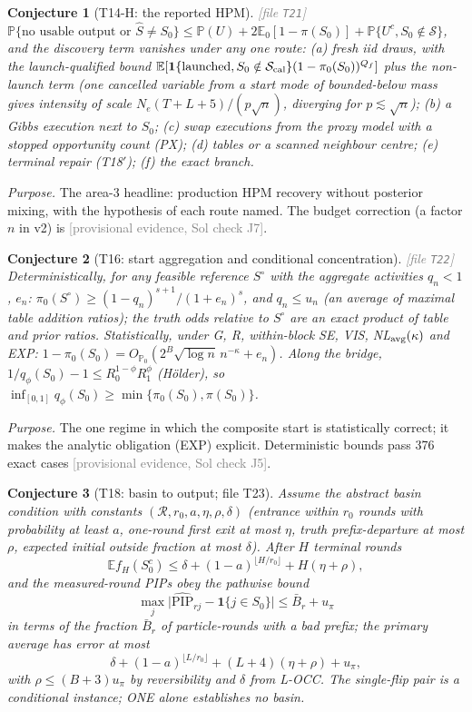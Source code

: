 \documentclass[11pt,a4paper]{article}
\theoremstyle{plain}
\newtheorem{conjecture}{Conjecture}[section]
\theoremstyle{definition}
\theoremstyle{remark}
\newcommand{\E}{\mathbb{E}}
\newcommand{\Prob}{\mathbb{P}}
\newcommand{\Pz}{\mathbb{P}_0}
\newcommand{\Ez}{\mathbb{E}_0}
\newcommand{\calS}{\mathcal{S}}
\newcommand{\calR}{\mathcal{R}}
\newcommand{\Sz}{S_0}
\newcommand{\Shat}{\widehat S}
\newcommand{\PIPhat}{\widehat{\mathrm{PIP}}}
\newcommand{\pizero}{\pi_0}
\newcommand{\Ne}{N_{e}}
\newcommand{\Qf}{Q_{f}}
\newcommand{\ind}[1]{\mathbf{1}\{#1\}}
\newcommand{\provisional}[1]{\textcolor{gray}{[provisional evidence, Sol check #1]}}
\newcommand{\thfile}[1]{\textcolor{gray}{\footnotesize[file \texttt{#1}]}}
\begin{document}
\begin{conjecture}[T14-H: the reported HPM]\thfile{T21}
$\Prob\{\text{no usable output or }\Shat\ne\Sz\}\le\Prob(U)+2\Ez[1-\pi(\Sz)]+\Prob\{U^c,\Sz\notin\calS\}$, and the discovery term vanishes under any one route: (a) fresh iid draws, with the launch-qualified bound $\E[\ind{\text{launched},\Sz\notin\calS_{\rm cal}}(1-\pizero(\Sz))^{\Qf}]$ plus the non-launch term (one cancelled variable from a start mode of bounded-below mass gives intensity of scale $\Ne(T+L+5)/(p\sqrt n)$, diverging for $p\lesssim\sqrt n$); (b) a Gibbs execution next to $\Sz$; (c) swap executions from the proxy model with a stopped opportunity count (PX); (d) tables or a scanned neighbour centre; (e) terminal repair (T18$'$); (f) the exact branch.
\end{conjecture}
\emph{Purpose.} The area-3 headline: production HPM recovery without posterior mixing, with the hypothesis of each route named. The budget correction (a factor $n$ in v2) is \provisional{J7}.

\begin{conjecture}[T16: start aggregation and conditional concentration]\thfile{T22}
Deterministically, for any feasible reference $S^\circ$ with the aggregate activities $q_n<1$, $e_n$: $\pizero(S^\circ)\ge(1-q_n)^{s+1}/(1+e_n)^s$, and $q_n\le u_n$ (an average of maximal table addition ratios); the truth odds relative to $S^\circ$ are an exact product of table and prior ratios. Statistically, under G, R, within-block SE, VIS, NL$_{\rm avg}(\kappa)$ \emph{and EXP}: $1-\pizero(\Sz)=O_{\Pz}(2^B\sqrt{\log n}\,n^{-\kappa}+e_n)$. Along the bridge, $1/q_\phi(\Sz)-1\le R_0^{1-\phi}R_1^{\phi}$ (H\"older), so $\inf_{[0,1]}q_\phi(\Sz)\ge\min\{\pizero(\Sz),\pi(\Sz)\}$.
\end{conjecture}
\emph{Purpose.} The one regime in which the composite start is statistically correct; it makes the analytic obligation (EXP) explicit. Deterministic bounds pass 376 exact cases \provisional{J5}.

\begin{conjecture}[T18: basin to output; file T23]
Assume the abstract basin condition with constants $(\calR,r_0,a,\eta,\rho,\delta)$ (entrance within $r_0$ rounds with probability at least $a$, one-round first exit at most $\eta$, truth prefix-departure at most $\rho$, expected initial outside fraction at most $\delta$). After $H$ terminal rounds
\[
\E f_H(\Sz^c)\le\delta+(1-a)^{\lfloor H/r_0\rfloor}+H(\eta+\rho),
\]
and the measured-round PIPs obey the pathwise bound
\[
\max_j\bigl|\PIPhat_{rj}-\ind{j\in\Sz}\bigr|\le\bar B_r+u_\pi
\]
in terms of the fraction $\bar B_r$ of particle-rounds with a bad prefix; the primary average has error at most
\[
\delta+(1-a)^{\lfloor L/r_0\rfloor}+(L+4)(\eta+\rho)+u_\pi,
\]
with $\rho\le(B+3)u_\pi$ by reversibility and $\delta$ from L-OCC. The single-flip pair is a conditional instance; ONE alone establishes no basin.
\end{conjecture}
\end{document}
